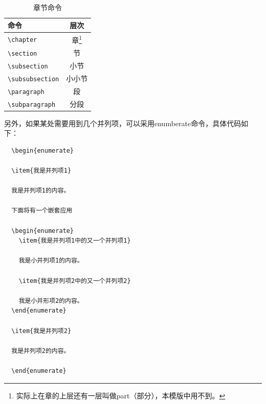 \begin{table}[thb]
\caption{章节命令}
\label{ChapsecList}
\centering
\begin{minipage}[c]{9cm}
\centering
\begin{tabular}{p{6cm}|c}
\hline
命令 & 层次\\
\hline
\verb+\chapter+ & 章\footnote{实际上在章的上层还有一层叫做part（部分），本模版中用不到。}\\
\hline
\verb+\section+ & 节\\
\hline
\verb+\subsection+ & 小节\\
\hline
\verb+\subsubsection+ & 小小节\\
\hline
\verb+\paragraph+ & 段\\
\hline
\verb+\subparagraph+ & 分段\\
\hline
\end{tabular}
\end{minipage}
\end{table}

另外，如果某处需要用到几个并列项，可以采用enumberate命令，具体代码如下：
{
\linespread{1}
\noindent
\begin{verbatim}
  \begin{enumerate}

  \item{我是并列项1} 

  我是并列项1的内容。

  下面将有一个嵌套应用

  \begin{enumerate}
    \item{我是并列项1中的又一个并列项1}

    我是小并列项1的内容。

    \item{我是并列项2中的又一个并列项2}

    我是小并形项2的内容。
  \end{enumerate}

  \item{我是并列项2}

  我是并列项2的内容。

  \end{enumerate}
\end{verbatim}
}

